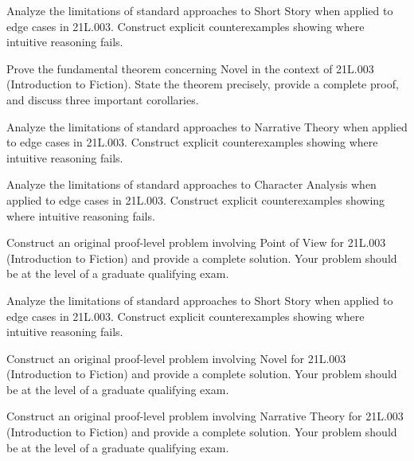 \documentclass[12pt,a4paper]{exam}
\begin{document}
\begin{questions}

\question[3]
Analyze the limitations of standard approaches to Short Story when applied to edge cases in 21L.003. Construct explicit counterexamples showing where intuitive reasoning fails.

\vspace{0.3cm}

\question[6]
Prove the fundamental theorem concerning Novel in the context of 21L.003 (Introduction to Fiction). State the theorem precisely, provide a complete proof, and discuss three important corollaries.

\vspace{0.3cm}

\question[5]
Analyze the limitations of standard approaches to Narrative Theory when applied to edge cases in 21L.003. Construct explicit counterexamples showing where intuitive reasoning fails.

\vspace{0.3cm}

\question[3]
Analyze the limitations of standard approaches to Character Analysis when applied to edge cases in 21L.003. Construct explicit counterexamples showing where intuitive reasoning fails.

\vspace{0.3cm}

\question[5]
Construct an original proof-level problem involving Point of View for 21L.003 (Introduction to Fiction) and provide a complete solution. Your problem should be at the level of a graduate qualifying exam.

\vspace{0.3cm}

\question[3]
Analyze the limitations of standard approaches to Short Story when applied to edge cases in 21L.003. Construct explicit counterexamples showing where intuitive reasoning fails.

\vspace{0.3cm}

\question[2]
Construct an original proof-level problem involving Novel for 21L.003 (Introduction to Fiction) and provide a complete solution. Your problem should be at the level of a graduate qualifying exam.

\vspace{0.3cm}

\question[6]
Construct an original proof-level problem involving Narrative Theory for 21L.003 (Introduction to Fiction) and provide a complete solution. Your problem should be at the level of a graduate qualifying exam.


\end{questions}
\end{document}
